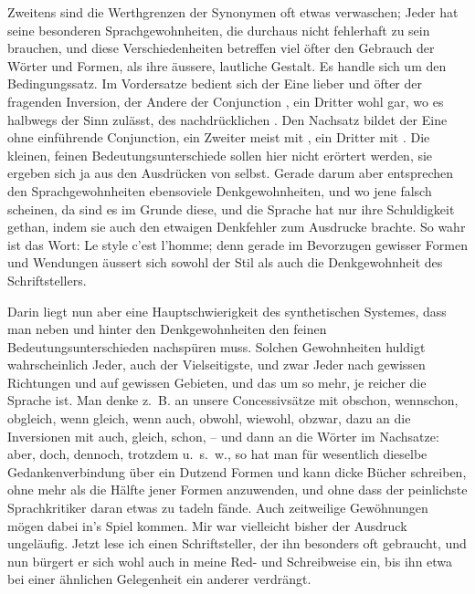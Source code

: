 Zweitens sind die Werthgrenzen der Synonymen oft etwas verwaschen; Jeder hat seine besonderen Sprachgewohnheiten, die durchaus nicht fehlerhaft zu sein brauchen, und diese Verschiedenheiten betreffen viel öfter den Gebrauch der Wörter und Formen, als ihre äussere, lautliche Gestalt. Es handle sich um den Bedingungssatz. Im Vordersatze bedient sich der Eine lieber und öfter der fragenden Inversion, der Andere der Conjunction , ein Dritter wohl gar, wo es halbwegs der Sinn zulässt, des nachdrücklichen . Den Nachsatz bildet der \label{fp.102} Eine ohne einführende Conjunction, ein Zweiter meist mit , ein Dritter mit . Die kleinen, feinen Bedeutungsunterschiede sollen hier nicht erörtert werden, sie ergeben sich ja aus den Ausdrücken von selbst. Gerade darum aber entsprechen den Sprachgewohnheiten ebensoviele Denkgewohnheiten, und wo jene falsch scheinen, da sind es im Grunde diese, und die Sprache hat nur ihre Schuldigkeit gethan, indem sie auch den etwaigen Denkfehler zum Ausdrucke brachte. So wahr ist das Wort: Le style c’est l’homme; denn gerade im Bevorzugen gewisser Formen und Wendungen äussert sich sowohl der Stil als auch die Denkgewohnheit des Schriftstellers.

\largerpage[1]Darin liegt nun aber eine Hauptschwierigkeit des synthetischen Systemes, dass man neben und hinter den Denkgewohnheiten den feinen Bedeutungsunterschieden nachspüren muss. Solchen Gewohnheiten huldigt wahrscheinlich Jeder, auch der Vielseitigste, und zwar Jeder nach gewissen Richtungen und auf gewissen Gebieten, und das um so mehr, je reicher die Sprache ist. Man denke z.~B. an unsere Concessivsätze mit obschon, wennschon, obgleich, wenn gleich, wenn auch, obwohl, wiewohl, obzwar, dazu an die Inversionen mit auch, gleich, schon, – und dann an die Wörter im Nachsatze: aber, doch, dennoch, trotzdem u.~s.~w., so hat man für wesentlich dieselbe Gedankenverbindung über ein Dutzend Formen und kann dicke Bücher schreiben, ohne mehr als die Hälfte jener Formen anzuwenden, und ohne dass der peinlichste Sprachkritiker daran etwas zu tadeln fände. Auch zeitweilige Gewöhnungen mögen dabei in’s Spiel kommen. Mir war vielleicht bisher der Ausdruck  ungeläufig. Jetzt \label{sp.99} lese ich einen Schriftsteller, der ihn besonders oft gebraucht, und nun bürgert er sich wohl auch in meine Red- und Schreibweise ein, bis ihn etwa bei einer ähnlichen Gelegenheit ein anderer verdrängt.

